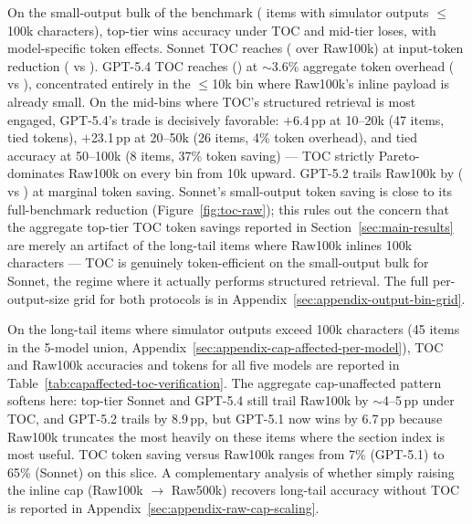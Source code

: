 \documentclass{article}
\begin{document}
On the small-output bulk of the benchmark (\RawCapUnaffectedN{} items with simulator outputs $\le$100k characters), top-tier wins accuracy under TOC and mid-tier loses, with model-specific token effects. Sonnet TOC reaches \SonnetTOCCapUnaffected{} (\SonnetTOCMinusRawCapUnaffected{} over Raw100k) at \SonnetTOCCapUnaffectedTokenReduction{} input-token reduction (\SonnetTOCCapUnaffectedTokens{} vs \SonnetRawCapUnaffectedTokens{}). GPT-5.4 TOC reaches \GPTFiveFourTOCCapUnaffected{} (\GPTFiveFourTOCMinusRawCapUnaffected{}) at $\sim$3.6\% aggregate token overhead (\GPTFiveFourTOCCapUnaffectedTokens{} vs \GPTFiveFourRawCapUnaffectedTokens{}), concentrated entirely in the $\le$10k bin where Raw100k's inline payload is already small. On the mid-bins where TOC's structured retrieval is most engaged, GPT-5.4's trade is decisively favorable: $+$6.4\,pp at 10--20k (47 items, tied tokens), $+$23.1\,pp at 20--50k (26 items, 4\% token overhead), and tied accuracy at 50--100k (8 items, 37\% token saving) --- TOC strictly Pareto-dominates Raw100k on every bin from 10k upward. GPT-5.2 trails Raw100k by \GPTFiveTwoTOCMinusRawCapUnaffected{} (\GPTFiveTwoTOCCapUnaffected{} vs \GPTFiveTwoRawCapUnaffected{}) at marginal \GPTFiveTwoTOCCapUnaffectedTokenReduction{} token saving. Sonnet's \SonnetTOCCapUnaffectedTokenReduction{} small-output token saving is close to its full-benchmark \SonnetTOCTokenReduction{} reduction (Figure~\ref{fig:toc-raw}); this rules out the concern that the aggregate top-tier TOC token savings reported in Section~\ref{sec:main-results} are merely an artifact of the \LargeOutputN{} long-tail items where Raw100k inlines 100k characters --- TOC is genuinely token-efficient on the small-output bulk for Sonnet, the regime where it actually performs structured retrieval. The full per-output-size grid for both protocols is in Appendix~\ref{sec:appendix-output-bin-grid}.

On the long-tail items where simulator outputs exceed 100k characters (45 items in the 5-model union, Appendix~\ref{sec:appendix-cap-affected-per-model}), TOC and Raw100k accuracies and tokens for all five models are reported in Table~\ref{tab:capaffected-toc-verification}. The aggregate cap-unaffected pattern softens here: top-tier Sonnet and GPT-5.4 still trail Raw100k by $\sim$4--5\,pp under TOC, and GPT-5.2 trails by 8.9\,pp, but GPT-5.1 now wins by 6.7\,pp because Raw100k truncates the most heavily on these items where the section index is most useful. TOC token saving versus Raw100k ranges from 7\% (GPT-5.1) to 65\% (Sonnet) on this slice. A complementary analysis of whether simply raising the inline cap (Raw100k $\to$ Raw500k) recovers long-tail accuracy without TOC is reported in Appendix~\ref{sec:appendix-raw-cap-scaling}.
\end{document}
